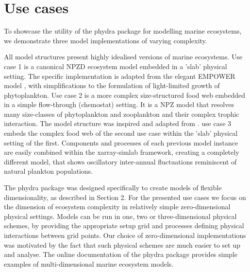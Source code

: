 \documentclass[journal abbreviation, manuscript]{copernicus}
\begin{document}
\section{Use cases}

To showcase the utility of the phydra package for modelling marine ecosystems, we demonstrate three model implementations of varying complexity.


All model structures present highly idealised versions of marine ecosystems. 
Use case 1 is a canonical NPZD ecosystem model embedded in a 'slab' physical setting. The specific implementation is adapted from the elegant EMPOWER model \citep{Anderson2015c}, with simplifications to the formulation of light-limited growth of phytoplankton. 
Use case 2 is a more complex size-structured food web embedded in a simple flow-through (chemostat) setting. It is a NPZ model that resolves many size-classes of phytoplankton and zooplankton and their complex trophic interaction. The model structure was inspired and adapted from \citet{Banas2011b}. 
use case 3 embeds the complex food web of the second use case within the 'slab' physical setting of the first. Components and processes of each previous model instance are easily combined within the xarray-simlab framework, creating a completely different model, that shows oscillatory inter-annual fluctuations reminiscent of natural plankton populations. 

The phydra package was designed specifically to create models of flexible dimensionality, as described in Section 2. For the presented use cases we focus on the dimension of ecosystem complexity in relatively simple zero-dimensional physical settings. Models can be run in one, two or three-dimensional physical schemes, by providing the appropriate setup grid and processes defining physical interactions between grid points. Our choice of zero-dimensional implementations was motivated by the fact that such physical schemes are much easier to set up and analyse. The online documentation of the phydra package provides simple examples of multi-dimensional marine ecosystem models.
\end{document}
